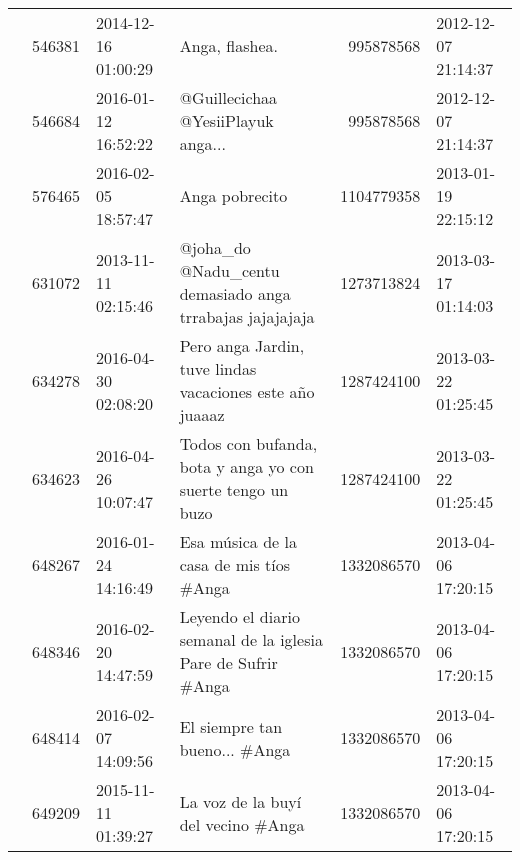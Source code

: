 \begin{tabular}{llllrl}
           & 546381  & 2014-12-16 01:00:29 &                                                                                                                               Anga, flashea. &   995878568 & 2012-12-07 21:14:37 \\
           & 546684  & 2016-01-12 16:52:22 &                                                                                                           @Guillecichaa @YesiiPlayuk anga... &   995878568 & 2012-12-07 21:14:37 \\
           & 576465  & 2016-02-05 18:57:47 &                                                                                                                               Anga pobrecito &  1104779358 & 2013-01-19 22:15:12 \\
           & 631072  & 2013-11-11 02:15:46 &                                                                                     @joha\_do @Nadu\_centu demasiado anga trrabajas jajajajaja &  1273713824 & 2013-03-17 01:14:03 \\
           & 634278  & 2016-04-30 02:08:20 &                                                                                     Pero anga Jardin, tuve lindas vacaciones este año juaaaz &  1287424100 & 2013-03-22 01:25:45 \\
           & 634623  & 2016-04-26 10:07:47 &                                                                                  Todos con bufanda,  bota y anga yo con suerte tengo un buzo &  1287424100 & 2013-03-22 01:25:45 \\
           & 648267  & 2016-01-24 14:16:49 &                                                                                                      Esa música de la casa de mis tíos \#Anga &  1332086570 & 2013-04-06 17:20:15 \\
           & 648346  & 2016-02-20 14:47:59 &                                                                                 Leyendo el diario semanal de la iglesia Pare de Sufrir \#Anga &  1332086570 & 2013-04-06 17:20:15 \\
           & 648414  & 2016-02-07 14:09:56 &                                                                                                                El siempre tan bueno... \#Anga &  1332086570 & 2013-04-06 17:20:15 \\
           & 649209  & 2015-11-11 01:39:27 &                                                                                                           La voz de la buyí del vecino \#Anga &  1332086570 & 2013-04-06 17:20:15 \\

\end{tabular}
